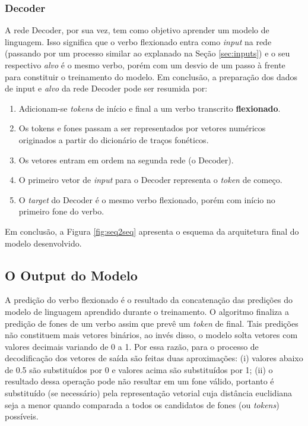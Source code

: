 \subsubsection{Decoder}

A rede Decoder, por sua vez, tem como objetivo aprender um modelo de linguagem. Isso significa que o verbo flexionado entra como \textit{input} na rede (passando por um processo similar ao explanado na Seção \ref{sec:inputs}) e o seu respectivo \textit{alvo} é o mesmo verbo, porém com um desvio de um passo à frente para constituir o treinamento do modelo. Em conclusão, a preparação dos dados de input e \textit{alvo} da rede Decoder pode ser resumida por:  

\begin{enumerate}
    \item Adicionam-se \textit{tokens} de início e final a um verbo transcrito \textbf{flexionado}.
    \item Os tokens e fones passam a ser representados por vetores numéricos originados a partir do dicionário de traços fonéticos.
    \item Os vetores entram em ordem na segunda rede (o Decoder).
    \item O primeiro vetor de \textit{input} para o Decoder representa o \textit{token} de começo.
    \item O \textit{target} do Decoder é o mesmo verbo flexionado, porém com início no primeiro fone do verbo.
\end{enumerate}

Em conclusão, a Figura \ref{fig:seq2seq} apresenta o esquema da arquitetura final do modelo desenvolvido. 



 \subsection{O Output do Modelo}

A predição do verbo flexionado é o resultado da concatenação das predições do modelo de linguagem aprendido durante o treinamento. O algoritmo finaliza a predição de fones de um verbo assim que prevê um \textit{token} de final. Tais predições não constituem mais vetores binários, ao invés disso, o modelo solta vetores com valores decimais variando de 0 a 1. Por essa razão, para o processo de decodificação dos vetores de saída são feitas duas aproximações: (i) valores abaixo de 0.5 são substituídos por 0 e valores acima são substituídos por 1; (ii) o resultado dessa operação pode não resultar em um fone válido, portanto é substituído (se necessário) pela representação vetorial cuja distância euclidiana seja a menor quando comparada a todos os candidatos de fones (ou \textit{tokens}) possíveis. 

